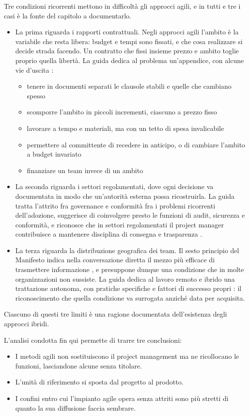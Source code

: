 Tre condizioni ricorrenti mettono in difficolt\`a gli approcci agili, e in tutti
e tre i casi \`e la fonte del capitolo a documentarlo.
\begin{itemize}
  \item La prima riguarda i rapporti contrattuali. 
  Negli approcci agili l'ambito \`e la variabile che resta libera: budget e tempi
sono fissati, e che cosa realizzare si decide strada facendo. Un contratto che
fissi insieme prezzo e ambito toglie proprio quella libert\`a. La guida dedica
al problema un'appendice, con alcune vie d'uscita
\cite{agilepracticeguide2}:
\begin {itemize}
\item tenere in documenti separati le clausole stabili e quelle che cambiano
spesso
\item scomporre l'ambito in piccoli incrementi, ciascuno a prezzo fisso
\item lavorare a tempo e materiali, ma con un tetto di spesa invalicabile
\item permettere al committente di recedere in anticipo, o di cambiare
l'ambito a budget invariato
\item finanziare un team invece di un ambito
\end {itemize}
 \item La seconda riguarda i settori regolamentati, dove ogni decisione va documentata
in modo che un'autorit\`a esterna possa ricostruirla. La guida
tratta l'attrito fra governance e conformit\`a fra i problemi ricorrenti
dell'adozione, suggerisce di coinvolgere presto le funzioni di audit, sicurezza
e conformit\`a, e riconosce che in settori regolamentati il project manager
contribuisce a mantenere disciplina di consegna e trasparenza
\cite{agilepracticeguide2}.
 \item La terza riguarda la distribuzione geografica dei team. Il sesto principio del
Manifesto indica nella conversazione diretta il mezzo pi\`u efficace di
trasmettere informazione \cite{agilemanifesto}, e presuppone dunque una
condizione che in molte organizzazioni non sussiste. La guida dedica al lavoro
remoto e ibrido una trattazione autonoma, con pratiche specifiche e fattori di
successo propri \cite{agilepracticeguide2}: il riconoscimento che quella
condizione va surrogata anzich\'e data per acquisita.
\end{itemize}

Ciascuno di questi tre limiti \`e una ragione documentata dell'esistenza degli
approcci ibridi.

L'analisi condotta fin qui permette di trarre tre conclusioni:
\begin {itemize}
\item I metodi agili non sostituiscono il project management ma ne ricollocano le funzioni,
lasciandone alcune senza titolare.
\item L'unit\`a di riferimento si sposta dal progetto al prodotto.
\item I confini entro cui l'impianto agile opera senza attriti sono pi\`u stretti
di quanto la sua diffusione faccia sembrare.
\end {itemize}



